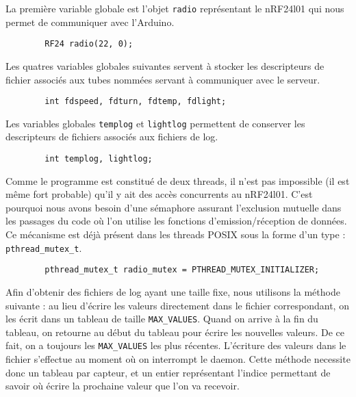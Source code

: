 La première variable globale est l'objet \texttt{radio} représentant le nRF24l01
qui nous permet de communiquer avec l'Arduino. \\

\begin{DDbox}{\linewidth}
\begin{lstlisting}
        RF24 radio(22, 0);
\end{lstlisting}
\end{DDbox}

Les quatres variables globales suivantes servent à stocker les descripteurs de
fichier associés aux tubes nommées servant à communiquer avec le serveur. \\

\begin{DDbox}{\linewidth}
\begin{lstlisting}
        int fdspeed, fdturn, fdtemp, fdlight;
\end{lstlisting}
\end{DDbox}

Les variables globales \texttt{templog} et \texttt{lightlog} permettent de 
conserver les descripteurs de fichiers associés aux fichiers de log. \\

\begin{DDbox}{\linewidth}
\begin{lstlisting}
        int templog, lightlog;
\end{lstlisting}
\end{DDbox}

Comme le programme est constitué de deux threads, il n'est pas impossible (il
est même fort probable) qu'il y ait des accès concurrents au nRF24l01. C'est 
pourquoi nous avons besoin d'une sémaphore assurant l'exclusion mutuelle dans
les passages du code où l'on utilise les fonctions d'emission/réception de
données. Ce mécanisme est déjà présent dans les threads POSIX sous la forme d'un
type : \texttt{pthread\_mutex\_t}. \\


\begin{DDbox}{\linewidth}
\begin{lstlisting}
        pthread_mutex_t radio_mutex = PTHREAD_MUTEX_INITIALIZER;
\end{lstlisting}
\end{DDbox}

Afin d'obtenir des fichiers de log ayant une taille fixe, nous utilisons la 
méthode suivante : au lieu d'écrire les valeurs directement dans le fichier
correspondant, on les écrit dans un tableau de taille \texttt{MAX\_VALUES}.
Quand on arrive à la fin du tableau, on retourne au début du tableau pour 
écrire les nouvelles valeurs. De ce fait, on a toujours les \texttt{MAX\_VALUES}
les plus récentes. L'écriture des valeurs dans le fichier s'effectue au moment 
où on interrompt le daemon. Cette méthode necessite donc un tableau par capteur,
et un entier représentant l'indice permettant de savoir où écrire la prochaine
valeur que l'on va recevoir. \\

